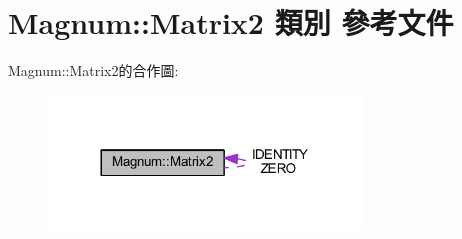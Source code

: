 \hypertarget{class_magnum_1_1_matrix2}{}\section{Magnum\+:\+:Matrix2 類別 參考文件}
\label{class_magnum_1_1_matrix2}


Magnum\+:\+:Matrix2的合作圖\+:\nopagebreak
\begin{figure}[H]
\begin{center}
\leavevmode
\includegraphics[width=236pt]{class_magnum_1_1_matrix2__coll__graph}
\end{center}
\end{figure}
